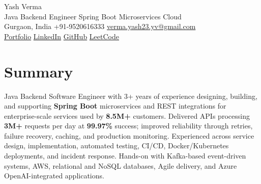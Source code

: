 \documentclass[letterpaper,11pt]{article}
\begin{document}
\begin{center}
  {\Huge Yash Verma} \\
  \small Java Backend Engineer \textperiodcentered{} Spring Boot \textperiodcentered{} Microservices \textperiodcentered{} Cloud \\
  \vspace{5pt}
  \small Gurgaon, India \textbar{} +91-9520616333 \textbar{}
  \href{mailto:verma.yash23.yv@gmail.com}{verma.yash23.yv@gmail.com} \\
  \vspace{7pt}
  \href{https://yashverma230600.github.io/yashV-portfolio/}{Portfolio} \textbar{}
  \href{https://www.linkedin.com/in/yash-verma-9243a7193/}{LinkedIn} \textbar{}
  \href{https://github.com/yashverma230600}{GitHub} \textbar{}
  \href{https://leetcode.com/yashverma230600}{LeetCode}
  \vspace{-8pt}
\end{center}

\section{Summary}
\begin{itemize}[leftmargin=0.15in, label={}]
  \small{\item{
    Java Backend Software Engineer with 3+ years of experience designing, building, and supporting \textbf{Spring Boot} microservices and REST integrations for enterprise-scale services used by \textbf{8.5M+} customers. Delivered APIs processing \textbf{3M+} requests per day at \textbf{99.97\%} success; improved reliability through retries, failure recovery, caching, and production monitoring. Experienced across service design, implementation, automated testing, CI/CD, Docker/Kubernetes deployments, and incident response. Hands-on with Kafka-based event-driven systems, AWS, relational and NoSQL databases, Agile delivery, and Azure OpenAI-integrated applications.
  }}
\end{itemize}
\vspace{-8pt}

\end{document}
